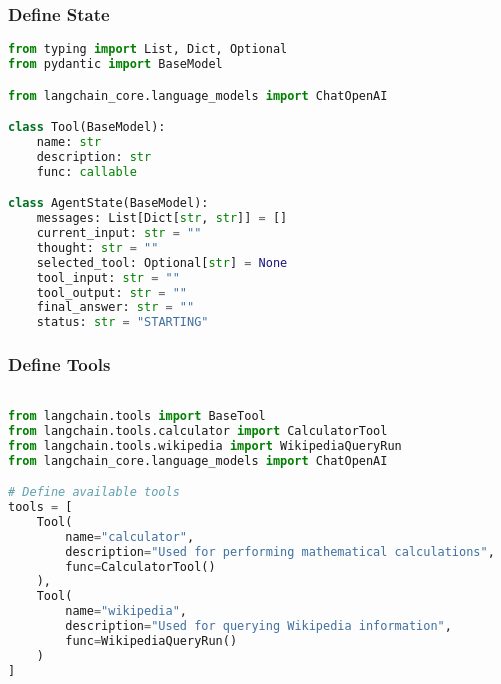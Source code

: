 \begin{frame}[fragile]\frametitle{Define State }
      \begin{lstlisting}[language=Python, basicstyle=\tiny]
from typing import List, Dict, Optional
from pydantic import BaseModel

from langchain_core.language_models import ChatOpenAI

class Tool(BaseModel):
    name: str
    description: str
    func: callable

class AgentState(BaseModel):
    messages: List[Dict[str, str]] = []
    current_input: str = ""
    thought: str = ""
    selected_tool: Optional[str] = None
    tool_input: str = ""
    tool_output: str = ""
    final_answer: str = ""
    status: str = "STARTING"

      \end{lstlisting}

\end{frame}

\begin{frame}[fragile]\frametitle{Define Tools}
      \begin{lstlisting}[language=Python, basicstyle=\tiny]

from langchain.tools import BaseTool
from langchain.tools.calculator import CalculatorTool
from langchain.tools.wikipedia import WikipediaQueryRun
from langchain_core.language_models import ChatOpenAI

# Define available tools
tools = [
    Tool(
        name="calculator",
        description="Used for performing mathematical calculations",
        func=CalculatorTool()
    ),
    Tool(
        name="wikipedia",
        description="Used for querying Wikipedia information",
        func=WikipediaQueryRun()
    )
]	
      \end{lstlisting}

\end{frame}


